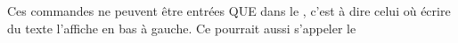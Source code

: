 \documentclass[a4paper,twoside]{article}
\begin{document}
\begin{attention}
Ces commandes ne peuvent être entrées QUE dans le , c'est à dire celui où écrire du texte l'affiche en bas à gauche. Ce  pourrait aussi s'appeler le 
\end{attention}

\clearpage
\printindex
\end{document}
